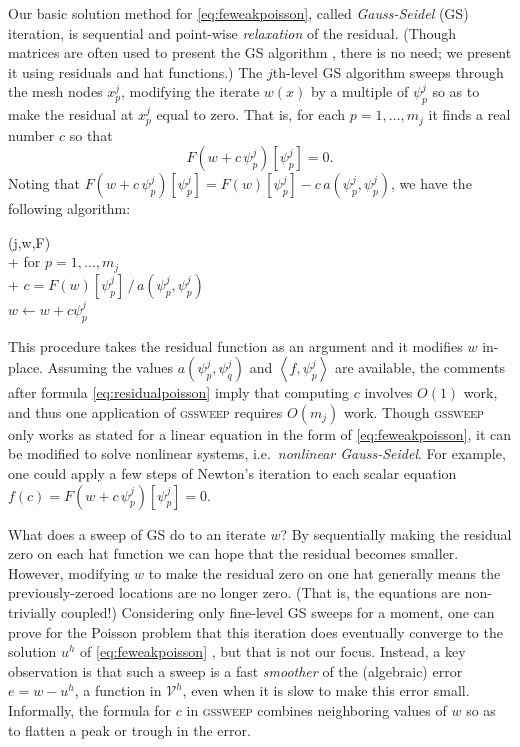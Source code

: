 \documentclass[letterpaper,final,12pt,reqno]{amsart}
\theoremstyle{claim}
\newcommand{\ip}[2]{\left<#1,#2\right>}
\numberwithin{equation}{section}
\numberwithin{figure}{section}
\numberwithin{table}{section}
\begin{document}
Our basic solution method for \eqref{eq:feweakpoisson}, called \emph{Gauss-Seidel} (GS) iteration, is sequential and point-wise \emph{relaxation} of the residual.  (Though matrices are often used to present the GS algorithm \cite[for example]{Bueler2021,Greenbaum1997}, there is no need; we present it using residuals and hat functions.)  The $j$th-level GS algorithm sweeps through the mesh nodes $x_p^j$, modifying the iterate $w(x)$ by a multiple of $\psi_p^j$ so as to make the residual at $x_p^j$ equal to zero.  That is, for each $p=1,\dots,m_j$ it finds a real number $c$ so that
\begin{equation}
  F(w+c\,\psi_p^j)[\psi_p^j] = 0.  \label{eq:gaussseidelpoint}
\end{equation}
Noting that $F(w+c\,\psi_p^j)[\psi_p^j] = F(w)[\psi_p^j] - c\, a(\psi_p^j,\psi_p^j)$, we have the following algorithm:
\begin{pseudo*}
(j,w,F)\text{:} \\+
    for $p=1,\dots,m_j$ \\+
        $\displaystyle c = F(w)[\psi_p^j]\, \big/ \,a(\psi_p^j,\psi_p^j)$  \\
        $w \gets w + c \psi_p^j$
\end{pseudo*}

This procedure takes the residual function as an argument and it modifies $w$ in-place.  Assuming the values $a(\psi_p^j,\psi_q^j)$ and $\ip{f}{\psi_p^j}$ are available, the comments after formula \eqref{eq:residualpoisson} imply that computing $c$ involves $O(1)$ work, and thus one application of \textsc{gssweep} requires $O(m_j)$ work.  Though \textsc{gssweep} only works as stated for a linear equation in the form of \eqref{eq:feweakpoisson}, it can be modified to solve nonlinear systems, i.e.~\emph{nonlinear Gauss-Seidel}.  For example, one could apply a few steps of Newton's iteration to each scalar equation $f(c) = F(w+c\,\psi_p^j)[\psi_p^j] = 0$.

What does a sweep of GS do to an iterate $w$?  By sequentially making the residual zero on each hat function we can hope that the residual becomes smaller.  However, modifying $w$ to make the residual zero on one hat generally means the previously-zeroed locations are no longer zero.  (That is, the equations are non-trivially coupled!)  Considering only fine-level GS sweeps for a moment, one can prove for the Poisson problem that this iteration does eventually converge to the solution $u^h$ of \eqref{eq:feweakpoisson} \cite[for example]{Greenbaum1997}, but that is not our focus.  Instead, a key observation is that such a sweep is a fast \emph{smoother} of the (algebraic) error $e=w-u^h$, a function in $\mathcal{V}^h$, even when it is slow to make this error small.  Informally, the formula for $c$ in \textsc{gssweep} combines neighboring values of $w$ so as to flatten a peak or trough in the error.
\end{document}
